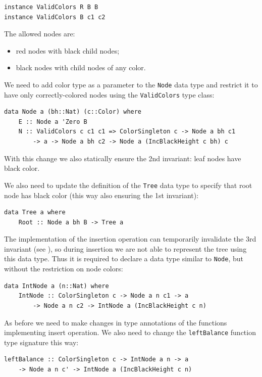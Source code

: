 \documentclass{tmr}
\begin{document}
\begin{Verbatim}
instance ValidColors R B B
instance ValidColors B c1 c2
\end{Verbatim}

The allowed nodes are:

\begin{itemize}
\item red nodes with black child nodes;
\item black nodes with child nodes of any color.
\end{itemize}

We need to add color type as a parameter to the \verb|Node| data type and restrict it to have only correctly-colored nodes using the \verb|ValidColors| type class:

\begin{Verbatim}
data Node a (bh::Nat) (c::Color) where
    E :: Node a 'Zero B
    N :: ValidColors c c1 c1 => ColorSingleton c -> Node a bh c1
        -> a -> Node a bh c2 -> Node a (IncBlackHeight c bh) c
\end{Verbatim}

With this change we also statically ensure the 2nd invariant: leaf nodes have black color.

We also need to update the definition of the \verb|Tree| data type to specify that root node has black color (this way also ensuring the 1st invariant):

\begin{Verbatim}
data Tree a where
    Root :: Node a bh B -> Tree a
\end{Verbatim}

The implementation of the insertion operation can temporarily invalidate the 3rd invariant (see ), so during insertion we are not able to represent the tree using this data type. Thus it is required to declare a data type similar to \verb|Node|, but without the restriction on node colors:

\begin{Verbatim}
data IntNode a (n::Nat) where
    IntNode :: ColorSingleton c -> Node a n c1 -> a
        -> Node a n c2 -> IntNode a (IncBlackHeight c n)
\end{Verbatim}

As before we need to make changes in type annotations of the functions implementing insert operation. We also need to change the \verb|leftBalance| function type signature this way:

\begin{Verbatim}
leftBalance :: ColorSingleton c -> IntNode a n -> a
    -> Node a n c' -> IntNode a (IncBlackHeight c n)
\end{Verbatim}
\end{document}
